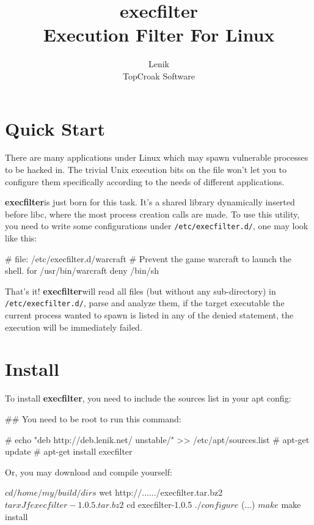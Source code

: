 \documentclass[hyperref, bookmark]{z-article}
\title {execfilter \\ Execution Filter For Linux }
\author{Lenik \\ \boDz TopCroak Software}
\newcommand\xfilt{\textbf{execfilter}}
\newcommand\configdir{\texttt{/etc/execfilter.d/}}
\begin{document}
\maketitle
\tableofcontents

\clearpage

\section {Quick Start}

There are many applications under Linux which may spawn vulnerable processes to
be hacked in.  The trivial Unix execution bits on the file won't let you to
configure them specifically according to the needs of different applications.


\xfilt is just born for this task. It's a shared library dynamically inserted
before libc, where the most process creation calls are made.  To use this
utility, you need to write some configurations under \configdir, one may look
like this:

\begin{codeblk}
  # file: /etc/execfilter.d/warcraft
  # Prevent the game warcraft to launch the shell.
  for /usr/bin/warcraft
      deny /bin/sh
\end{codeblk}

That's it! \xfilt will read all files (but without any sub-directory) in
\configdir, parse and analyze them, if the target executable the current process
wanted to spawn is listed in any of the denied statement, the execution will be
immediately failed.

\section {Install}

To install \xfilt, you need to include the \boDz sources list in your apt
config:

\begin{console}
  ## You need to be root to run this command:

  # echo "deb http://deb.lenik.net/ unstable/" >> /etc/apt/sources.list
  # apt-get update
  # apt-get install execfilter
\end{console}

Or, you may download and compile yourself:

\begin{console}
  $ cd /home/my/build/dirs
  $ wet http://....../execfilter.tar.bz2
  $ tar xJf execfilter-1.0.5.tar.bz2
  $ cd execfilter-1.0.5
  $ ./configure
  $  (...)
  $ make
  $ make install
\end{console}
\end{document}
